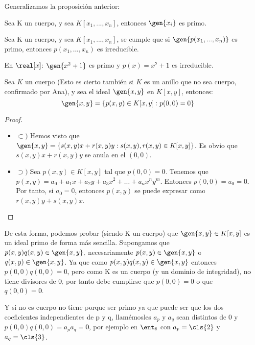 Generalizamos la proposición anterior:
\begin{prop}
	Sea K un cuerpo, y sea $K[x_1,...,x_n]$, entonces $\gen{x_i}$ es primo.
\end{prop}

\begin{prop}
	Sea K un cuerpo, y sea $K[x_1,...,x_n]$, se cumple que si $\gen{p(x_1,...,x_n)}$ es primo,  entonces $p(x_1,...,x_n)$ es irreducible.
\end{prop}

\begin{example}
	En $\real[x]$: $\gen{x^2+1}$ es primo y $p(x)=x^2+1$ es irreducible.
\end{example}

\begin{prop}\label{prop:def_idealGeneradoxy}
	Sea $K$ un cuerpo (Esto es cierto también si $K$ es un anillo que no sea cuerpo, confirmado por Ana), y sea el ideal $\gen{x,y}$ en $K[x,y]$, entonces:
	$$\gen{x,y}=\{p(x,y)\in K[x,y]:p(0,0)=0 \}$$
\end{prop}

\begin{proof}
	\begin{itemize}
		\item $\subset)$ Hemos visto que $\gen{x,y}=\{s(x,y) x+r(x,y) y: s(x,y),r(x,y) \in K[x,y] \}$. Es obvio que $s(x,y) x+r(x,y) y$ se anula en el $(0,0)$.
		\item $\supset)$ Sea $p(x,y) \in K[x,y]$ tal que $p(0,0)=0$. Tenemos que $p(x,y)=a_0+a_1x+a_2y+a_3x^2+...+a_nx^ny^m$. Entonces $p(0,0)=a_0=0$. Por tanto, si $a_0=0$, entonces $p(x,y)$ se puede expresar como $r(x,y)y+s(x,y)x$.
	\end{itemize}
\end{proof}

\obs De esta forma, podemos probar (siendo K un cuerpo) que $\gen{x,y} \in K[x,y]$ es un ideal primo de forma más sencilla. Supongamos que $p(x,y)q(x,y) \in \gen{x,y}$, necesariamente $p(x,y) \in \gen{x,y}$ o $q(x,y) \in \gen{x,y}$. Ya que como $p(x,y)q(x,y) \in \gen{x,y}$ entonces $p(0,0)q(0,0)=0$, pero como K es un cuerpo (y un dominio de integridad), no tiene divisores de 0, por tanto debe cumplirse que $p(0,0)=0$ o que $q(0,0)=0$.

\obs Y si no es cuerpo no tiene porque ser primo ya que puede ser que los dos coeficientes independientes de p y q, llamémosles $a_p$ y $a_q$ sean distintos de 0 y $p(0,0)q(0,0)=a_pa_q=0$, por ejemplo en $\ent_6$ con $a_p=\cls{2}$ y $a_q=\cls{3}$.

